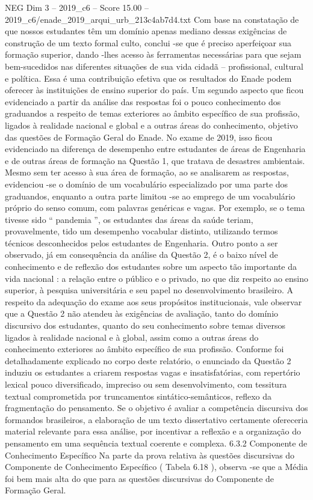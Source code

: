 \begin{textsample}{NEG Dim 3 – 2019\_c6 – Score 15.00 – 2019\_c6/enade\_2019\_arqui\_urb\_213c4ab7d4.txt}
Com base na constatação de que nossos estudantes têm um domínio apenas mediano dessas exigências de construção de um texto formal culto, conclui -se que é preciso aperfeiçoar sua formação superior, dando -lhes acesso às ferramentas necessárias para que sejam bem-sucedidos nas diferentes situações de sua vida cidadã – profissional, cultural e política.
Essa é uma contribuição efetiva que os resultados do Enade podem oferecer às instituições de ensino superior do país.
Um segundo aspecto que ficou evidenciado a partir da análise das respostas foi o pouco conhecimento dos graduandos a respeito de temas exteriores ao âmbito específico de sua profissão, ligados à realidade nacional e global e a outras áreas do conhecimento, objetivo das questões de Formação Geral do Enade.
No exame de 2019, isso ficou evidenciado na diferença de desempenho entre estudantes de áreas de Engenharia e de outras áreas de formação na Questão 1, que tratava de desastres ambientais.
Mesmo sem ter acesso à sua área de formação, ao se analisarem as respostas, evidenciou -se o domínio de um vocabulário especializado por uma parte dos graduandos, enquanto a outra parte limitou -se ao emprego de um vocabulário próprio do senso comum, com palavras genéricas e vagas.
Por exemplo, se o tema tivesse sido “ pandemia ”, os estudantes das áreas da saúde teriam, provavelmente, tido um desempenho vocabular distinto, utilizando termos técnicos desconhecidos pelos estudantes de Engenharia.
Outro ponto a ser observado, já em consequência da análise da Questão 2, é o baixo nível de conhecimento e de reflexão dos estudantes sobre um aspecto tão importante da vida nacional : a relação entre o público e o privado, no que diz respeito ao ensino superior, à pesquisa universitária e seu papel no desenvolvimento brasileiro.
A respeito da adequação do exame aos seus propósitos institucionais, vale observar que a Questão 2 não atendeu às exigências de avaliação, tanto do domínio discursivo dos estudantes, quanto do seu conhecimento sobre temas diversos ligados à realidade nacional e à global, assim como a outras áreas do conhecimento exteriores ao âmbito específico de sua profissão.
Conforme foi detalhadamente explicado no corpo deste relatório, o enunciado da Questão 2 induziu os estudantes a criarem respostas vagas e insatisfatórias, com repertório lexical pouco diversificado, impreciso ou sem desenvolvimento, com tessitura textual comprometida por truncamentos sintático-semânticos, reflexo da fragmentação do pensamento.
Se o objetivo é avaliar a competência discursiva dos formandos brasileiros, a elaboração de um texto dissertativo certamente ofereceria material relevante para essa análise, por incentivar a reflexão e a organização do pensamento em uma sequência textual coerente e complexa. 6.3.2 Componente de Conhecimento Específico Na parte da prova relativa às questões discursivas do Componente de Conhecimento Específico ( Tabela 6.18 ), observa -se que a Média foi bem mais alta do que para as questões discursivas do Componente de Formação Geral.

\end{textsample}
